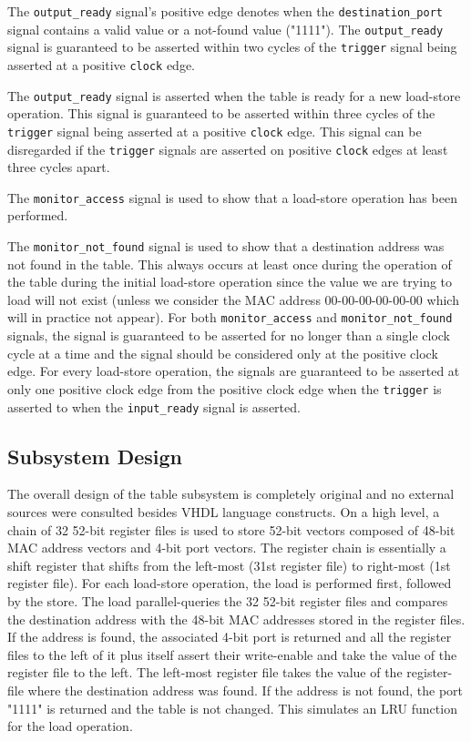 \documentclass{article}
\begin{document}
The \texttt{output\_ready} signal's positive edge denotes when the \texttt{destination\_port} signal contains a valid value or a not-found value ("1111"). The \texttt{output\_ready} signal is guaranteed to be asserted within two cycles of the \texttt{trigger} signal being asserted at a positive \texttt{clock} edge. 

The \texttt{output\_ready} signal is asserted when the table is ready for a new load-store operation. This signal is guaranteed to be asserted within three cycles of the \texttt{trigger} signal being asserted at a positive \texttt{clock} edge. This signal can be disregarded if the \texttt{trigger} signals are asserted on positive \texttt{clock} edges at least three cycles apart. 

The \texttt{monitor\_access} signal is used to show that a load-store operation has been performed. 

The \texttt{monitor\_not\_found} signal is used to show that a destination address was not found in the table. This always occurs at least once during the operation of the table during the initial load-store operation since the value we are trying to load will not exist (unless we consider the MAC address 00-00-00-00-00-00 which will in practice not appear). For both \texttt{monitor\_access} and \texttt{monitor\_not\_found} signals, the signal is guaranteed to be asserted for no longer than a single clock cycle at a time and the signal should be considered only at the positive clock edge. For every load-store operation, the signals are guaranteed to be asserted at only one positive clock edge from the positive clock edge when the \texttt{trigger} is asserted to when the \texttt{input\_ready} signal is asserted.

\newpage
\subsection{Subsystem Design}

The overall design of the table subsystem is completely original and no external sources were consulted besides VHDL language constructs. On a high level, a chain of 32 52-bit register files is used to store 52-bit vectors composed of 48-bit MAC address vectors and 4-bit port vectors. The register chain is essentially a shift register that shifts from the left-most (31st register file) to right-most (1st register file). For each load-store operation, the load is performed first, followed by the store. The load parallel-queries the 32 52-bit register files and compares the destination address with the 48-bit MAC addresses stored in the register files. If the address is found, the associated 4-bit port is returned and all the register files to the left of it plus itself assert their write-enable and take the value of the register file to the left. The left-most register file takes the value of the register-file where the destination address was found. If the address is not found, the port "1111" is returned and the table is not changed. This simulates an LRU function for the load operation. 
\end{document}
